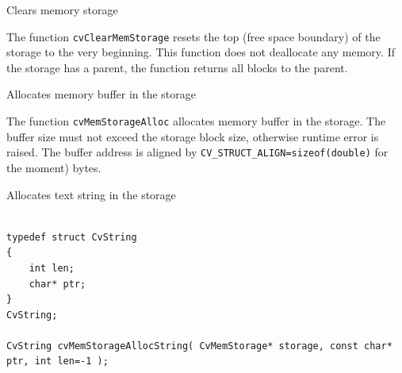 \label{ClearMemStorage}

Clears memory storage


\begin{description}
\end{description}

The function \texttt{cvClearMemStorage} resets the top (free space
boundary) of the storage to the very beginning. This function does not
deallocate any memory. If the storage has a parent, the function returns
all blocks to the parent.

\label{MemStorageAlloc}

Allocates memory buffer in the storage


\begin{description}
\end{description}

The function \texttt{cvMemStorageAlloc} allocates memory buffer in
the storage. The buffer size must not exceed the storage block size,
otherwise runtime error is raised. The buffer address is aligned by
\texttt{CV\_STRUCT\_ALIGN=sizeof(double)} for the moment) bytes.

\label{MemStorageAllocString}

Allocates text string in the storage

\begin{lstlisting}

typedef struct CvString
{
    int len;
    char* ptr;
}
CvString;

CvString cvMemStorageAllocString( CvMemStorage* storage, const char* ptr, int len=-1 );

\end{lstlisting}

\begin{description}
\end{description}

